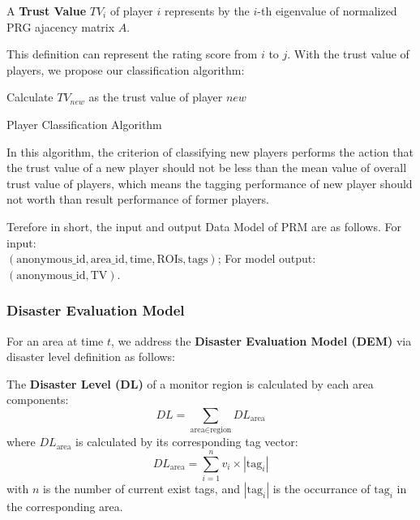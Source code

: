 \begin{definition}
A \textbf{Trust Value} $TV_i$ of player $i$ represents by the $i$-th eigenvalue of normalized PRG ajacency matrix $A$.
\end{definition}

This definition can represent the rating score from $i$ to $j$. With the trust value of players,
we propose our classification algorithm:

\begin{algorithm}[H]
\SetAlgoLined
{}
Calculate $TV_{new}$ as the trust value of player $new$ \;
\caption{Player Classification Algorithm}
\end{algorithm}

In this algorithm, the criterion of classifying new players performs the action that 
the trust value of a new player should not be less than the mean value of overall trust value of players, 
which means the tagging performance of new player should not worth than result performance of former players.

Terefore in short, the input and output Data Model of PRM are as follows. For input:\\
$(\text{anonymous\_id}, \text{area\_id}, \text{time}, \text{ROIs}, \text{tags})$; 
For model output: 
$(\text{anonymous\_id}, \text{TV})$.

\subsubsection{Disaster Evaluation Model}
\label{chapter:dem}

For an area at time $t$, we address the \textbf{Disaster Evaluation Model (DEM)} 
via disaster level definition as follows:

\begin{definition}
\label{def:dl}
The \textbf{Disaster Level (DL)} of a monitor region is calculated by each area components:
\[
  DL = \sum_{\text{area}\in\text{region}}{DL_{\text{area}}}
\]
where $DL_{\text{area}}$ is calculated by its corresponding tag vector:
\[
  DL_{\text{area}} = \sum_{i=1}^{n}{v_i \times |\text{tag}_i|}
\]
with $n$ is the number of current exist tags, and $|\text{tag}_i|$ is the occurrance of $\text{tag}_i$
in the corresponding area.
\end{definition}

